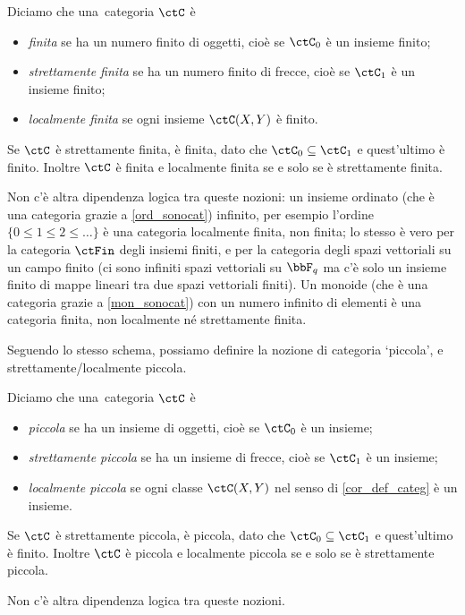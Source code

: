 \begin{definition}\label{cat_finita_locfinita}
 Diciamo che una~categoria \(\ctC\) è
 \begin{itemize}
  \item \emph{finita} se ha un numero finito di oggetti, cioè se \(\ctC_0\) è un insieme finito;
  \item \emph{strettamente finita} se ha un numero finito di frecce, cioè se \(\ctC_1\) è un insieme finito;
  \item \emph{localmente finita} se ogni insieme \(\Hom{\ctC}(X,Y)\) è finito.
 \end{itemize}
 Se \(\ctC\) è strettamente finita, è finita, dato che \(\ctC_0\subseteq\ctC_1\) e quest'ultimo è finito. Inoltre \(\ctC\) è finita e localmente finita se e solo se è strettamente finita.

 Non c'è altra dipendenza logica tra queste nozioni: un insieme ordinato (che è una categoria grazie a \ref{ord_sonocat}) infinito, per esempio l'ordine \(\{0\le 1 \le 2 \le\dots\}\) è una categoria localmente finita, non finita; lo stesso è vero per la categoria \(\ctFin\) degli insiemi finiti, e per la categoria degli spazi vettoriali su un campo finito (ci sono infiniti spazi vettoriali su \(\bbF_q\) ma c'è solo un insieme finito di mappe lineari tra due spazi vettoriali finiti). Un monoide (che è una categoria grazie a \ref{mon_sonocat}) con un numero infinito di elementi è una categoria finita, non localmente né strettamente finita.
\end{definition}
Seguendo lo stesso schema, possiamo definire la nozione di categoria `piccola', e strettamente/localmente piccola.
\begin{definition}\label{def_cat_piccola_locpiccola}
 Diciamo che una~categoria \(\ctC\) è
 \begin{itemize}
  \item \emph{piccola} se ha un insieme di oggetti, cioè se \(\ctC_0\) è un insieme;
  \item \emph{strettamente piccola} se ha un insieme di frecce, cioè se \(\ctC_1\) è un insieme;
  \item \emph{localmente piccola} se ogni classe \(\Hom{\ctC}(X,Y)\) nel senso di \ref{cor_def_categ} è un insieme.
 \end{itemize}
 Se \(\ctC\) è strettamente piccola, è piccola, dato che \(\ctC_0\subseteq\ctC_1\) e quest'ultimo è finito. Inoltre \(\ctC\) è piccola e localmente piccola se e solo se è strettamente piccola.

 Non c'è altra dipendenza logica tra queste nozioni.
\end{definition}
